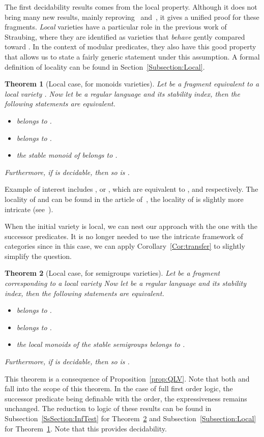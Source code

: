 \documentclass[submission,hidelink]{dmtcs-episciences}
\newtheorem{theorem}{Theorem}
\begin{document}
 
The first decidability results comes from the local property.
Although it does not bring many new results, mainly reproving~\cite{Bar92} and~\cite{DP13}, it gives a unified proof for these fragments.
\emph{Local} varieties have a particular role in the previous work of Straubing, where they are identified as varieties that \emph{behave}
gently compared toward . In the context of modular predicates, they also have this good property that allows us to state a
fairly generic statement under this assumption. A formal definition of locality can be found in Section~\ref{Subsection:Local}.
\begin{theorem}[Local case, for monoids varieties]\label{Main:local}
	Let  be a fragment equivalent to a local variety .
Now let  be a regular language and  its stability index, then the following statements are equivalent.
\begin{itemize}
	\item   belongs to .
	\item   belongs to .
	\item  the stable monoid of  belongs to .
\end{itemize}
Furthermore, if  is decidable, then so is .
\end{theorem}
Example of interest includes  ,  or , which are equivalent to ,  and  respectively.
The locality of  and  can be found in the article of~\cite{Tilson}, the locality of  is slightly more intricate (see~\cite{Almeida96}).


When the initial variety is local, we can nest our approach with the one with the successor predicates. It is no longer needed to
use the intricate framework of categories since in this case, we can apply Corollary~\ref{Cor:transfer} to slightly simplify the question.
\begin{theorem}[Local case, for semigroups varieties]\label{Main:local2}
Let  be a fragment corresponding to a local variety 
Now let  be a regular language and  its stability index, then the following statements are equivalent.
\begin{itemize}
	\item   belongs to .
	\item   belongs to .
	\item  the local monoids of the stable semigroups belongs to .
\end{itemize}
Furthermore, if  is decidable, then so is .
\end{theorem}
This theorem is a consequence of Proposition~\ref{prop:QLV}.
Note that both  and  fall into the scope of this theorem. In the case of full first order
logic, the successor predicate being definable with the order, the expressiveness remains unchanged. The reduction to logic of these results can be found in Subsection~\ref{SsSection:InfTest} for Theorem~\ref{Main:local2} and Subsection~\ref{Subsection:Local} for Theorem~\ref{Main:local}. Note that this provides decidability.
\end{document}
